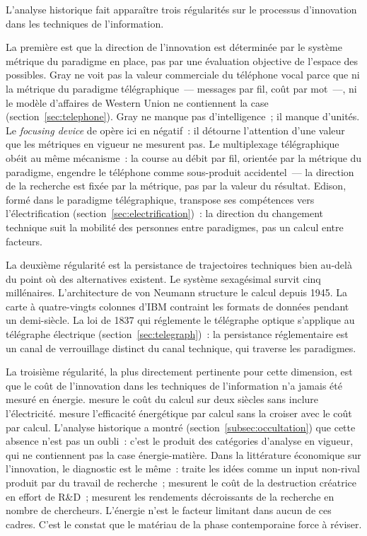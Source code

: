 L'analyse historique fait apparaître trois régularités sur le processus d'innovation dans les techniques de l'information.

La première est que la direction de l'innovation est déterminée par le système métrique du paradigme en place, pas par une évaluation objective de l'espace des possibles. Gray ne voit pas la valeur commerciale du téléphone vocal parce que ni la métrique du paradigme télégraphique~--- messages par fil, coût par mot~---, ni le modèle d'affaires de Western Union ne contiennent la case (section~\ref{sec:telephone}). Gray ne manque pas d'intelligence~; il manque d'unités. Le \emph{focusing device} de \textcite{rosenberg_factors_1969} opère ici en négatif~: il détourne l'attention d'une valeur que les métriques en vigueur ne mesurent pas. Le multiplexage télégraphique obéit au même mécanisme~: la course au débit par fil, orientée par la métrique du paradigme, engendre le téléphone comme sous-produit accidentel~--- la direction de la recherche est fixée par la métrique, pas par la valeur du résultat. Edison, formé dans le paradigme télégraphique, transpose ses compétences vers l'électrification (section~\ref{sec:electrification})~: la direction du changement technique suit la mobilité des personnes entre paradigmes, pas un calcul entre facteurs.

La deuxième régularité est la persistance de trajectoires techniques bien au-delà du point où des alternatives existent. Le système sexagésimal survit cinq millénaires. L'architecture de von Neumann structure le calcul depuis 1945. La carte à quatre-vingts colonnes d'IBM contraint les formats de données pendant un demi-siècle. La loi de 1837 qui réglemente le télégraphe optique s'applique au télégraphe électrique (section~\ref{sec:telegraph})~: la persistance réglementaire est un canal de verrouillage distinct du canal technique, qui traverse les paradigmes.

La troisième régularité, la plus directement pertinente pour cette dimension, est que le coût de l'innovation dans les techniques de l'information n'a jamais été mesuré en énergie. \textcite{nordhaus_two_2007} mesure le coût du calcul sur deux siècles sans inclure l'électricité. \textcite{koomey_implications_2011} mesure l'efficacité énergétique par calcul sans la croiser avec le coût par calcul. L'analyse historique a montré (section~\ref{subsec:occultation}) que cette absence n'est pas un oubli~: c'est le produit des catégories d'analyse en vigueur, qui ne contiennent pas la case énergie-matière. Dans la littérature économique sur l'innovation, le diagnostic est le même~: \textcite{romer_endogenous_1990} traite les idées comme un input non-rival produit par du travail de recherche~; \textcite{aghion_model_1992} mesurent le coût de la destruction créatrice en effort de R\&D~; \textcite{bloom_ideas_2020} mesurent les rendements décroissants de la recherche en nombre de chercheurs. L'énergie n'est le facteur limitant dans aucun de ces cadres. C'est le constat que le matériau de la phase contemporaine force à réviser.


